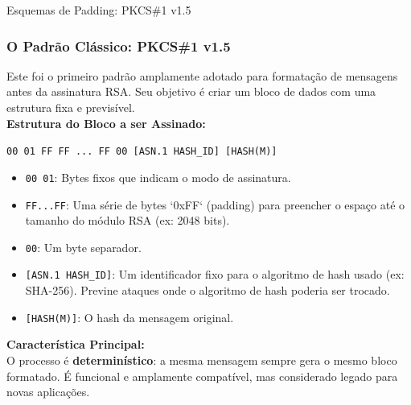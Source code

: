 \documentclass{beamer}
\begin{document}
\begin{frame}{Esquemas de Padding: PKCS\#1 v1.5}
    \frametitle{O Padrão Clássico: PKCS\#1 v1.5}
    \small
    Este foi o primeiro padrão amplamente adotado para formatação de mensagens antes da assinatura RSA. Seu objetivo é criar um bloco de dados com uma estrutura fixa e previsível.\\
    \vspace{-0.1em}
    \textbf{Estrutura do Bloco a ser Assinado:}\\
    \vspace{-0.2em}
    \begin{center}
    \texttt{\textcolor{red!60!black}{00 01} \textcolor{gray!80!black}{FF FF ... FF} \textcolor{red!60!black}{00} [ASN.1 HASH\_ID] [HASH(M)]}   
    \end{center}
    \vspace{-0.3em}
    
    \begin{itemize}
        \item \texttt{\textcolor{red!60!black}{00 01}}: Bytes fixos que indicam o modo de assinatura.
        \item \texttt{\textcolor{gray!80!black}{FF...FF}}: Uma série de bytes `0xFF` (padding) para preencher o espaço até o tamanho do módulo RSA (ex: 2048 bits).
        \item \texttt{\textcolor{red!60!black}{00}}: Um byte separador.
        \item \texttt{[ASN.1 HASH\_ID]}: Um identificador fixo para o algoritmo de hash usado (ex: SHA-256). Previne ataques onde o algoritmo de hash poderia ser trocado.
        \item \texttt{[HASH(M)]}: O hash da mensagem original.
    \end{itemize}
    \textbf{Característica Principal:}\\
    O processo é \textbf{determinístico}: a mesma mensagem sempre gera o mesmo bloco formatado. É funcional e amplamente compatível, mas considerado legado para novas aplicações.
\end{frame}
\end{document}
